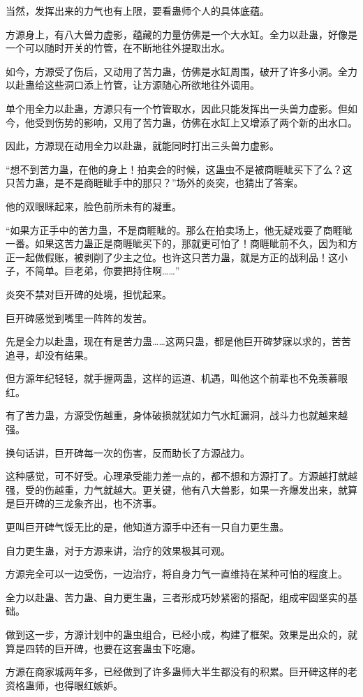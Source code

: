 \begin{this_body}
当然，发挥出来的力气也有上限，要看蛊师个人的具体底蕴。

方源身上，有八大兽力虚影，蕴藏的力量仿佛是一个大水缸。全力以赴蛊，好像是一个可以随时开关的竹管，在不断地往外提取出水。

如今，方源受了伤后，又动用了苦力蛊，仿佛是水缸周围，破开了许多小洞。全力以赴蛊给这些洞口添上竹管，让方源随心所欲地往外调用。

单个用全力以赴蛊，方源只有一个竹管取水，因此只能发挥出一头兽力虚影。但如今，他受到伤势的影响，又用了苦力蛊，仿佛在水缸上又增添了两个新的出水口。

因此，方源现在动用全力以赴蛊，就能同时打出三头兽力虚影。

“想不到苦力蛊，在他的身上！拍卖会的时候，这蛊虫不是被商睚眦买下了么？这只苦力蛊，是不是商睚眦手中的那只？”场外的炎突，也猜出了答案。

他的双眼眯起来，脸色前所未有的凝重。

“如果方正手中的苦力蛊，不是商睚眦的。那么在拍卖场上，他无疑戏耍了商睚眦一番。如果这苦力蛊正是商睚眦买下的，那就更可怕了！商睚眦前不久，因为和方正一起做假账，被剥削了少主之位。也许这只苦力蛊，就是方正的战利品！这小子，不简单。巨老弟，你要把持住啊……”

炎突不禁对巨开碑的处境，担忧起来。

巨开碑感觉到嘴里一阵阵的发苦。

先是全力以赴蛊，现在有是苦力蛊……这两只蛊，都是他巨开碑梦寐以求的，苦苦追寻，却没有结果。

但方源年纪轻轻，就手握两蛊，这样的运道、机遇，叫他这个前辈也不免羡慕眼红。

有了苦力蛊，方源受伤越重，身体破损就犹如力气水缸漏洞，战斗力也就越来越强。

换句话讲，巨开碑每一次的伤害，反而助长了方源战力。

这种感觉，可不好受。心理承受能力差一点的，都不想和方源打了。方源越打就越强，受的伤越重，力气就越大。更关键，他有八大兽影，如果一齐爆发出来，就算是巨开碑的三龙象齐出，也不济事。

更叫巨开碑气馁无比的是，他知道方源手中还有一只自力更生蛊。

自力更生蛊，对于方源来讲，治疗的效果极其可观。

方源完全可以一边受伤，一边治疗，将自身力气一直维持在某种可怕的程度上。

全力以赴蛊、苦力蛊、自力更生蛊，三者形成巧妙紧密的搭配，组成牢固坚实的基础。

做到这一步，方源计划中的蛊虫组合，已经小成，构建了框架。效果是出众的，就算是四转的巨开碑，也要在这套蛊虫下吃瘪。

方源在商家城两年多，已经做到了许多蛊师大半生都没有的积累。巨开碑这样的老资格蛊师，也得眼红嫉妒。

\end{this_body}

